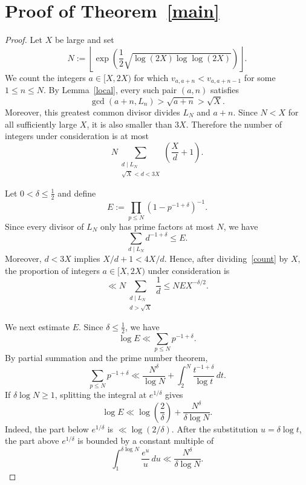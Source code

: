 \documentclass{amsart}
\begin{document}
\section{Proof of Theorem~\ref{main}}
\begin{proof}
Let $X$ be large and set
$$
N:=\left\lfloor\exp\left(\frac12\sqrt{\log(2X)\log\log(2X)}\right)\right\rfloor.
$$
We count the integers $a\in[X,2X)$ for which $v_{a,a+n}<v_{a,a+n-1}$ for some $1\le n\le N$. By Lemma~\ref{local}, every such pair $(a,n)$ satisfies
$$
\gcd(a+n,L_n)>\sqrt{a+n}>\sqrt X.
$$
Moreover, this greatest common divisor divides $L_N$ and $a+n$. Since $N<X$ for all sufficiently large $X$, it is also smaller than $3X$. Therefore the number of integers under consideration is at most
\begin{equation}\label{count}
N\sum_{\substack{d\mid L_N\\ \sqrt X<d<3X}}\left(\frac Xd+1\right).
\end{equation}

Let $0<\delta\le\frac12$ and define
$$
E:=\prod_{p\le N}\left(1-p^{-1+\delta}\right)^{-1}.
$$
Since every divisor of $L_N$ only has prime factors at most $N$, we have
$$
\sum_{d\mid L_N}d^{-1+\delta}\le E.
$$
Moreover, $d<3X$ implies $X/d+1<4X/d$. Hence, after dividing~\eqref{count} by $X$, the proportion of integers $a\in[X,2X)$ under consideration is
\begin{equation}\label{proportion}
\ll N\sum_{\substack{d\mid L_N\\d>\sqrt X}}\frac1d
\le NE X^{-\delta/2}.
\end{equation}

We next estimate $E$. Since $\delta\le\frac12$, we have
$$
\log E\ll\sum_{p\le N}p^{-1+\delta}.
$$
By partial summation and the prime number theorem,
$$
\sum_{p\le N}p^{-1+\delta}
\ll \frac{N^\delta}{\log N}+\int_2^N\frac{t^{-1+\delta}}{\log t}\,dt.
$$
If $\delta\log N\ge1$, splitting the integral at $e^{1/\delta}$ gives
\begin{equation}\label{eulerbound}
\log E\ll \log\left(\frac2\delta\right)+\frac{N^\delta}{\delta\log N}.
\end{equation}
Indeed, the part below $e^{1/\delta}$ is $\ll\log(2/\delta)$. After the substitution $u=\delta\log t$, the part above $e^{1/\delta}$ is bounded by a constant multiple of
$$
\int_1^{\delta\log N}\frac{e^u}{u}\,du
\ll \frac{N^\delta}{\delta\log N}.
$$


\end{proof}
\end{document}
